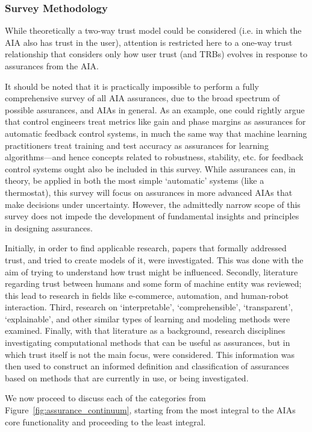 \subsubsection*{Survey Methodology} \label{sec:methodology}
    While theoretically a two-way trust model could be considered (i.e. in which the AIA also has trust in the user), attention is restricted here to a one-way trust relationship that considers only how user trust (and TRBs) evolves in response to assurances from the AIA. 

    It should be noted that it is practically impossible to perform a fully comprehensive survey of all AIA assurances, due to the broad spectrum of possible assurances, and AIAs in general. As an example, one could rightly argue that control engineers treat metrics like gain and phase margins as assurances for automatic feedback control systems, in much the same way that machine learning practitioners treat training and test accuracy as assurances for learning algorithms---and hence concepts related to robustness, stability, etc. for feedback control systems ought also be included in this survey. While assurances can, in theory, be applied in both the most simple `automatic' systems (like a thermostat), this survey will focus on assurances in more advanced AIAs that make decisions under uncertainty. However, the admittedly narrow scope of this survey does not impede the development of fundamental insights and principles in designing assurances.

    Initially, in order to find applicable research, papers that formally addressed trust, and tried to create models of it, were investigated. This was done with the aim of trying to understand how trust might be influenced. Secondly, literature regarding trust between humans and some form of machine entity was reviewed; this lead to research in fields like e-commerce, automation, and human-robot interaction. Third, research on `interpretable', `comprehensible', `transparent', `explainable', and other similar types of learning and modeling methods were examined. Finally, with that literature as a background, research disciplines investigating computational methods that can be useful as assurances, but in which trust itself is not the main focus, were considered. This information was then used to construct an informed definition and classification of assurances based on methods that are currently in use, or being investigated.
    
    We now proceed to discuss each of the categories from Figure~\ref{fig:assurance_continuum}, starting from the most integral to the AIAs core functionality and proceeding to the least integral.
